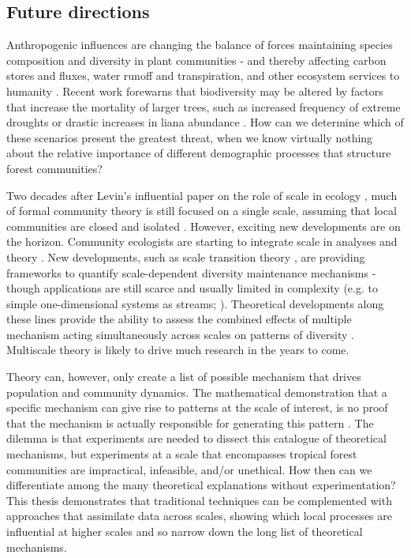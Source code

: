 \documentclass[b5paper,justified]{tufte-book} %
\begin{document}
\subsection{Future directions}
\begin{fullwidth}
Anthropogenic influences are changing the balance of forces maintaining species composition and diversity in plant communities - and thereby affecting carbon stores and fluxes, water runoff and transpiration, and other ecosystem services to humanity \citep{Chapin2000,Hooper2012}. Recent work forewarns that biodiversity may be altered by factors that increase the mortality of larger trees, such as increased frequency of extreme droughts \citep{Bennett2015} or drastic increases in liana abundance \citep{Phillips2002, Schnitzer2011}. How can we determine which of these scenarios present the greatest threat, when we know virtually nothing about the relative importance of different demographic processes that structure forest communities?

Two decades after Levin's influential paper on the role of scale in ecology \citep{Levin1992}, much of formal community theory is still focused on a single scale, assuming that local communities are closed and isolated \citep[see e.g.][]{Leibold2004}. However, exciting new developments are on the horizon. Community ecologists are starting to integrate scale in analyses and theory \citep[see e.g.][]{Chave2013}. New developments, such as scale transition theory \citep[e.g.][]{Chesson2012} , are providing frameworks to quantify scale-dependent diversity maintenance mechanisms - though applications are still scarce and usually limited in complexity (e.g. to simple one-dimensional systems as streams; \citealt{Holt2016}).  Theoretical developments along these lines provide the ability to assess the combined effects of multiple mechanism acting simultaneously across scales on patterns of diversity \citep{Benedetti-Cecchi2012}. Multiscale theory is likely to drive much research in the years to come. 

Theory can, however, only create a list of possible mechanism that drives population and community dynamics. The mathematical demonstration that a specific mechanism can give rise to patterns at the scale of interest, is no proof that the mechanism is actually responsible for generating this pattern \citep{Levin1992}. The dilemma is that experiments are needed to dissect this catalogue of theoretical mechanisms, but experiments at a scale that encompasses tropical forest communities are impractical, infeasible, and/or unethical. How then can we differentiate among the many theoretical explanations without experimentation?  This thesis demonstrates that traditional techniques can be complemented with approaches that assimilate data across scales, showing which local processes are influential at higher scales and so narrow down the long list of theoretical mechanisms. \end{fullwidth} 
\end{document}
